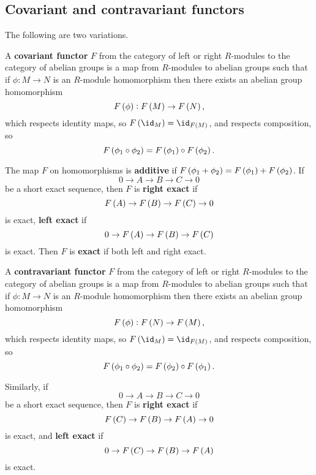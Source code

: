 \subsection{Covariant and contravariant functors}


The following are two variations.

\begin{definition}
A \textbf{covariant functor} $ F $ from the category of left or right $ R $-modules to the category of abelian groups is a map from $ R $-modules to abelian groups such that if $ \phi : M \to N $ is an $ R $-module homomorphism then there exists an abelian group homomorphism
$$ F\br{\phi} : F\br{M} \to F\br{N}, $$
which respects identity maps, so $ F\br{\id_M} = \id_{F\br{M}} $, and respects composition, so
$$ F\br{\phi_1 \circ \phi_2} = F\br{\phi_1} \circ F\br{\phi_2}. $$
\end{definition}

The map $ F $ on homomorphisms is \textbf{additive} if $ F\br{\phi_1 + \phi_2} = F\br{\phi_1} + F\br{\phi_2} $. If
$$ 0 \to A \to B \to C \to 0 $$
be a short exact sequence, then $ F $ is \textbf{right exact} if
$$ F\br{A} \to F\br{B} \to F\br{C} \to 0 $$
is exact, \textbf{left exact} if
$$ 0 \to F\br{A} \to F\br{B} \to F\br{C} $$
is exact. Then $ F $ is \textbf{exact} if both left and right exact.

\begin{definition}
A \textbf{contravariant functor} $ F $ from the category of left or right $ R $-modules to the category of abelian groups is a map from $ R $-modules to abelian groups such that if $ \phi : M \to N $ is an $ R $-module homomorphism then there exists an abelian group homomorphism
$$ F\br{\phi} : F\br{N} \to F\br{M}, $$
which respects identity maps, so $ F\br{\id_M} = \id_{F\br{M}} $, and respects composition, so
$$ F\br{\phi_1 \circ \phi_2} = F\br{\phi_2} \circ F\br{\phi_1}. $$
\end{definition}

Similarly, if
$$ 0 \to A \to B \to C \to 0 $$
be a short exact sequence, then $ F $ is \textbf{right exact} if
$$ F\br{C} \to F\br{B} \to F\br{A} \to 0 $$
is exact, and \textbf{left exact} if
$$ 0 \to F\br{C} \to F\br{B} \to F\br{A} $$
is exact.

